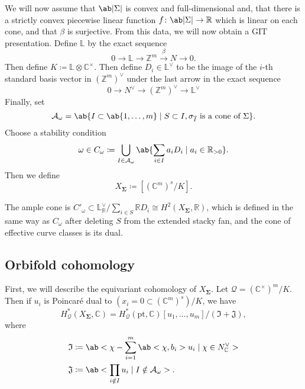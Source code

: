 \documentclass{amsart}
\theoremstyle{definition}
\theoremstyle{remark}
\theoremstyle{plain}
\theoremstyle{definition}
\theoremstyle{remark}
\newcommand{\R}{\mathbb{R}}
\newcommand{\C}{\mathbb{C}}
\newcommand{\Z}{\mathbb{Z}}
\renewcommand{\L}{\mathbb{L}}
\newcommand{\mc}[1]{\mathcal{#1}}
\newcommand{\mf}[1]{\mathfrak{#1}}
\newcommand{\mr}[1]{\mathrm{#1}}
\newcommand{\ol}[1]{\overline{#1}}
\newcommand{\1}{\mathbf{1}}
\newcommand{\2}{\mathbf{2}}
\newcommand{\3}{\mathbf{3}}
\begin{document}
We will now assume that $\ab|\Sigma|$ is convex and full-dimensional and, that there is a strictly convex piecewise linear function $f \colon \ab|\Sigma| \to \R$ which is linear on each cone, and that $\beta$ is surjective. From this data, we will now obtain a GIT presentation. Define $\L$ by the exact sequence
\[ 0 \to \L \xrightarrow{} \Z^m \xrightarrow{\beta} N \to 0. \]
Then define $K \coloneqq \L \otimes \C^{\times}$. Then define $D_i \in \L^{\vee}$ to be the image of the $i$-th standard basis vector in $(\Z^m)^{\vee}$ under the last arrow in the exact sequence
\[ 0 \to N^{\vee} \to (\Z^m)^{\vee} \to \L^{\vee} \]
Finally, set
\[ \mc{A}_{\omega} = \ab\{I \subset \ab\{1,\ldots,m\} \mid S \subset I, \sigma_{\ol{I}} \text{ is a cone of }\Sigma\}. \]
Choose a stability condition
\[ \omega \in C_{\omega} \coloneqq \bigcup_{I \in \mc{A}_{\omega}} \ab\{ \sum_{i \in I} a_i D_i \mid a_i \in \R_{>0}\}. \]
Then we define
\[ X_{\bm{\Sigma}} \coloneqq [(\C^m)^{s} / K]. \]

The ample cone is $C'_{\omega} \subset \L^{\vee}_{\R} / \sum_{i \in S} \R D_i \cong H^2(X_{\bm{\Sigma}}, \R)$, which is defined in the same way as $C_{\omega}$ after deleting $S$ from the extended stacky fan, and the cone of effective curve classes is its dual.

\subsection{Orbifold cohomology}%
\label{sub:Orbifold cohomology}

First, we will describe the equivariant cohomology of $X_{\bm{\Sigma}}$. Let $\mc{Q} = (\C^{\times})^m/K$. Then if $u_i$ is Poincar\'e dual to $(x_i = 0 \subset (\C^m)^s)/K$, we have
\[ H_{\mc{Q}}^*(X_{\bm{\Sigma}}, \C) = H_{\mc{Q}}^*(\mr{pt}, \C) [u_1, \ldots, u_m] / (\mf{I} + \mf{J}), \]
where
\begin{align*}
    \mf{I} &\coloneqq \ab< \chi - \sum_{i=1}^m \ab<\chi, b_i>u_i \mid \chi \in N^{\vee}_{\C}> \\
    \mf{J} &\coloneqq \ab<\prod_{i \notin I} u_i \mid I \notin \mc{A}_{\omega}>.
\end{align*}
\end{document}
